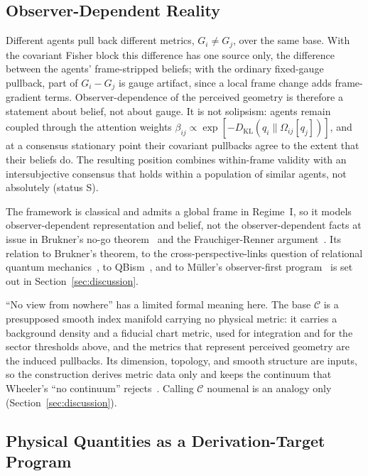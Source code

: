 \documentclass[11pt]{article}
\begin{document}
\subsection{Observer-Dependent Reality}
\label{sec:observer}

Different agents pull back different metrics, $G_i \neq G_j$, over the same base. With the covariant Fisher block this difference has one source only, the difference between the agents' frame-stripped beliefs; with the ordinary fixed-gauge pullback, part of $G_i - G_j$ is gauge artifact, since a local frame change adds frame-gradient terms. Observer-dependence of the perceived geometry is therefore a statement about belief, not about gauge. It is not solipsism: agents remain coupled through the attention weights $\beta_{ij} \propto \exp[-D_{\mathrm{KL}}(q_i \| \Omega_{ij}[q_j])]$, and at a consensus stationary point their covariant pullbacks agree to the extent that their beliefs do. The resulting position combines within-frame validity with an intersubjective consensus that holds within a population of similar agents, not absolutely (status S).

The framework is classical and admits a global frame in Regime~I, so it models observer-dependent representation and belief, not the observer-dependent facts at issue in Brukner's no-go theorem~\cite{Brukner2018} and the Frauchiger-Renner argument~\cite{frauchiger2018quantum}. Its relation to Brukner's theorem, to the cross-perspective-links question of relational quantum mechanics~\cite{AdlamRovelli2022}, to QBism~\cite{Fuchs2017, DeBrotaFuchsSchack2020}, and to M\"uller's observer-first program~\cite{Mueller2020} is set out in Section~\ref{sec:discussion}.

``No view from nowhere'' has a limited formal meaning here. The base $\mathcal{C}$ is a presupposed smooth index manifold carrying no physical metric: it carries a background density and a fiducial chart metric, used for integration and for the sector thresholds above, and the metrics that represent perceived geometry are the induced pullbacks. Its dimension, topology, and smooth structure are inputs, so the construction derives metric data only and keeps the continuum that Wheeler's ``no continuum'' rejects~\cite{Wheeler1990}. Calling $\mathcal{C}$ noumenal is an analogy only (Section~\ref{sec:discussion}).

\subsection{Physical Quantities as a Derivation-Target Program}
\label{sec:phenomenological_interpretation}
\end{document}
